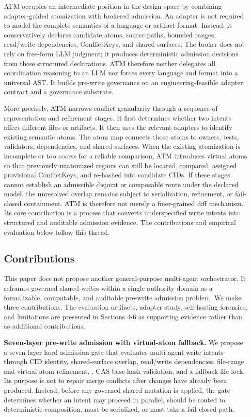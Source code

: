 \documentclass[9pt,letterpaper]{extarticle}
\begin{document}
ATM occupies an intermediate position in the design space by combining adapter-guided atomization with brokered admission. An adapter is not required to model the complete semantics of a language or artifact format. Instead, it conservatively declares candidate atoms, source paths, bounded ranges, read/write dependencies, ConflictKeys, and shared surfaces. The broker does not rely on free-form LLM judgment; it produces deterministic admission decisions from these structured declarations. ATM therefore neither delegates all coordination reasoning to an LLM nor forces every language and format into a universal AST. It builds pre-write governance on an engineering-feasible adapter contract and a governance substrate.

More precisely, ATM narrows conflict granularity through a sequence of representation and refinement stages. It first determines whether two intents affect different files or artifacts. It then uses the relevant adapters to identify existing semantic atoms. The atom map connects those atoms to owners, tests, validators, dependencies, and shared surfaces. When the existing atomization is incomplete or too coarse for a reliable comparison, ATM introduces virtual atoms so that previously unatomized regions can still be located, compared, assigned provisional ConflictKeys, and re-hashed into candidate CIDs. If these stages cannot establish an admissible disjoint or composable route under the declared model, the unresolved overlap remains subject to serialization, refinement, or fail-closed containment. ATM is therefore not merely a finer-grained diff mechanism. Its core contribution is a process that converts underspecified write intents into structured and auditable admission evidence. The contributions and empirical evaluation below follow this thread.

\subsection{Contributions}

This paper does not propose another general-purpose multi-agent orchestrator. It reframes governed shared writes within a single authority domain as a formalizable, computable, and auditable pre-write admission problem. We make three contributions. The evaluation artifacts, adopter study, self-hosting forensics, and limitations are presented in Sections 4-6 as supporting evidence rather than as additional contributions.

\textbf{Seven-layer pre-write admission with virtual-atom fallback.} We propose a seven-layer hard admission gate that evaluates multi-agent write intents through CID identity, shared-surface overlap, read/write dependencies, file-range and virtual-atom refinement, \texttt{}, CAS base-hash validation, and a fallback file lock. Its purpose is not to repair merge conflicts after changes have already been produced. Instead, before any governed shared mutation is applied, the gate determines whether an intent may proceed in parallel, should be routed to deterministic composition, must be serialized, or must take a fail-closed path.
\end{document}
